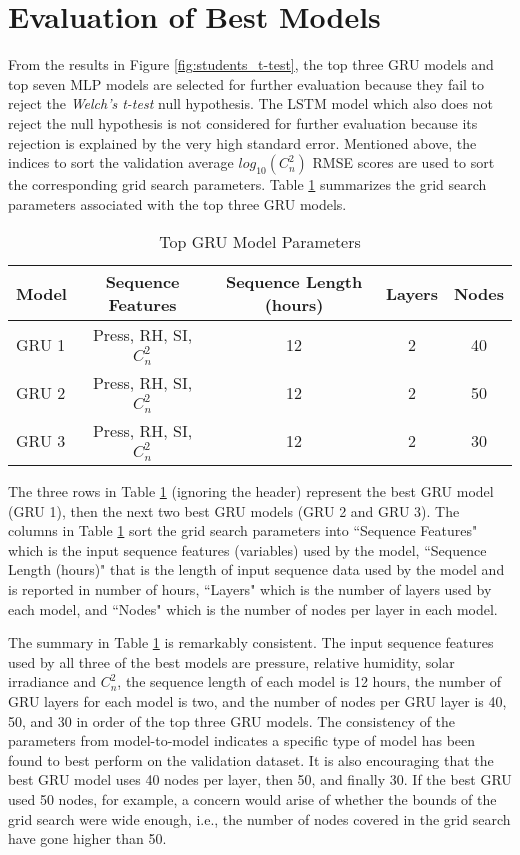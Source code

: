 \section{Evaluation of Best Models}
From the results in Figure \ref{fig:students_t-test}, the top three GRU models and top seven MLP models are selected for further evaluation because they fail to reject the \textit{Welch's t-test} null hypothesis. The LSTM model which also does not reject the null hypothesis is not considered for further evaluation because its rejection is explained by the very high standard error. Mentioned above, the indices to sort the validation average $log_{10}(C_{n}^{2})$ RMSE scores are used to sort the corresponding grid search parameters. Table \ref{tab:grid_search_results_GRU} summarizes the grid search parameters associated with the top three GRU models.
\begin{table}[h!]
	\begin{center}
		\caption{Top GRU Model Parameters}
		\label{tab:grid_search_results_GRU}
		\begin{tabular}{||l|c|c|c|c||}
			\hline
			Model & Sequence Features & Sequence Length (hours) & Layers & Nodes \\
			\hline
			\hline
			GRU 1 & Press, RH, SI, $C_{n}^{2}$ & 12 & 2 & 40 \\
			\hline
			GRU 2 & Press, RH, SI, $C_{n}^{2}$ & 12 & 2 & 50 \\
			\hline
			GRU 3 & Press, RH, SI, $C_{n}^{2}$ & 12 & 2 & 30 \\
			\hline
		\end{tabular}
	\end{center}
\end{table}
The three rows in Table \ref{tab:grid_search_results_GRU} (ignoring the header) represent the best GRU model (GRU 1), then the next two best GRU models (GRU 2 and GRU 3). The columns in Table \ref{tab:grid_search_results_GRU} sort the grid search parameters into ``Sequence Features" which is the input sequence features (variables) used by the model, ``Sequence Length (hours)" that is the length of input sequence data used by the model and is reported in number of hours, ``Layers" which is the number of layers used by each model, and ``Nodes" which is the number of nodes per layer in each model.

The summary in Table \ref{tab:grid_search_results_GRU} is remarkably consistent. The input sequence features used by all three of the best models are pressure, relative humidity, solar irradiance and $C_{n}^{2}$, the sequence length of each model is 12 hours, the number of GRU layers for each model is two, and the number of nodes per GRU layer is 40, 50, and 30 in order of the top three GRU models. The consistency of the parameters from model-to-model indicates a specific type of model has been found to best perform on the validation dataset. It is also encouraging that the best GRU model uses 40 nodes per layer, then 50, and finally 30. If the best GRU used 50 nodes, for example, a concern would arise of whether the bounds of the grid search were wide enough, i.e., the number of nodes covered in the grid search have gone higher than 50.

